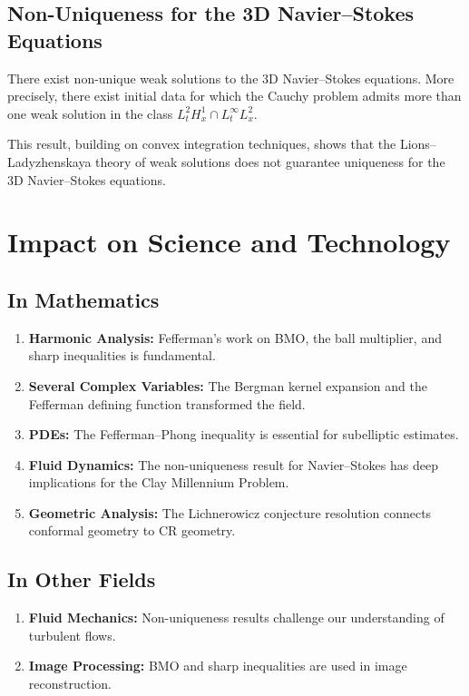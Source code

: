 \subsection{Non-Uniqueness for the 3D Navier--Stokes Equations}

\begin{theorem}
There exist non-unique weak solutions to the 3D Navier--Stokes equations. More precisely, there exist initial data for which the Cauchy problem admits more than one weak solution in the class $L^2_t H^1_x \cap L^\infty_t L^2_x$.
\end{theorem}

This result, building on convex integration techniques, shows that the Lions--Ladyzhenskaya theory of weak solutions does not guarantee uniqueness for the 3D Navier--Stokes equations.

\section{Impact on Science and Technology}

\subsection{In Mathematics}

\begin{enumerate}
    \item \textbf{Harmonic Analysis:} Fefferman's work on BMO, the ball multiplier, and sharp inequalities is fundamental.
    \item \textbf{Several Complex Variables:} The Bergman kernel expansion and the Fefferman defining function transformed the field.
    \item \textbf{PDEs:} The Fefferman--Phong inequality is essential for subelliptic estimates.
    \item \textbf{Fluid Dynamics:} The non-uniqueness result for Navier--Stokes has deep implications for the Clay Millennium Problem.
    \item \textbf{Geometric Analysis:} The Lichnerowicz conjecture resolution connects conformal geometry to CR geometry.
\end{enumerate}

\subsection{In Other Fields}

\begin{enumerate}
    \item \textbf{Fluid Mechanics:} Non-uniqueness results challenge our understanding of turbulent flows.
    \item \textbf{Image Processing:} BMO and sharp inequalities are used in image reconstruction.
\end{enumerate}

